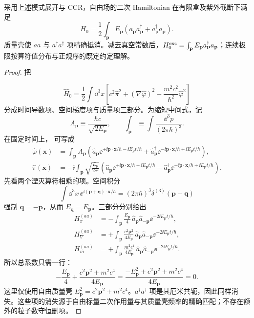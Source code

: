 \begin{proposition}
采用上述模式展开与 CCR，自由场的二次 Hamiltonian 在有限盒及紫外截断下满足
\[
H_0=\frac12\int_{\mathbf p}E_{\mathbf p}(a_{\mathbf p}a_{\mathbf p}^\dagger+a_{\mathbf p}^\dagger a_{\mathbf p}).
\]
质量壳使 $aa$ 与 $a^\dagger a^\dagger$ 项精确抵消。减去真空常数后，$H_0^{\rm exc}=\int_{\mathbf p}E_{\mathbf p}a_{\mathbf p}^\dagger a_{\mathbf p}$；连续极限按算符值分布与正规序的既定约定理解。
\end{proposition}
\begin{proof}
把

\begin{equation*}
 \hat H_0=\frac12\int\dd^3 x\left[
 c^2\hat\pi^2+(\nabla\hat\varphi)^2
 +\frac{m^2c^2}{\hbar^2}\hat\varphi^2
 \right]
 \end{equation*}
分成时间导数项、空间梯度项与质量项三部分。为缩短中间式，记
\begin{equation*}
 A_{\mathbf p}\equiv\frac{\hbar c}{\sqrt{2E_{\mathbf p}}},
 \qquad \int_{\mathbf p}\equiv\int\frac{\dd^3 p}{(2\pi\hbar)^3}.
\end{equation*}
在固定时间上， 可写成
\begin{align*}
 \hat\varphi(\mathbf x)
 &=\int_{\mathbf p}A_{\mathbf p}
 \left(\hat a_{\mathbf p}\ee^{+\ii\mathbf p\cdot\mathbf x/\hbar-\ii E_{\mathbf p}t/\hbar}
 +\hat a_{\mathbf p}^\dagger \ee^{-\ii\mathbf p\cdot\mathbf x/\hbar+\ii E_{\mathbf p}t/\hbar}\right),\\
 \hat\pi(\mathbf x)
 &=-\ii\int_{\mathbf p}\sqrt{\frac{E_{\mathbf p}}{2c^2}}
 \left(\hat a_{\mathbf p}\ee^{+\ii\mathbf p\cdot\mathbf x/\hbar-\ii E_{\mathbf p}t/\hbar}
 -\hat a_{\mathbf p}^\dagger \ee^{-\ii\mathbf p\cdot\mathbf x/\hbar+\ii E_{\mathbf p}t/\hbar}\right).
 \end{align*}
先看两个湮灭算符相乘的项。空间积分
\begin{equation*}
 \int\dd^3 x\,
 \ee^{\ii(\mathbf p+\mathbf q)\cdot\mathbf x/\hbar}
 =(2\pi\hbar)^3\delta^{(3)}(\mathbf p+\mathbf q)
 \end{equation*}
强制 $\mathbf q=-\mathbf p$，从而 $E_{\mathbf q}=E_{\mathbf p}$。三部分分别给出
\begin{align*}
 H_{\pi}^{(aa)}
 &=-\int_{\mathbf p}\frac{E_{\mathbf p}}{4}\,
 \hat a_{\mathbf p}\hat a_{-\mathbf p}
 \ee^{-2\ii E_{\mathbf p}t/\hbar},\\
 H_{\nabla}^{(aa)}
 &=+\int_{\mathbf p}\frac{c^2\mathbf p^2}{4E_{\mathbf p}}\,
 \hat a_{\mathbf p}\hat a_{-\mathbf p}
 \ee^{-2\ii E_{\mathbf p}t/\hbar},\\
 H_{m}^{(aa)}
 &=+\int_{\mathbf p}\frac{m^2c^4}{4E_{\mathbf p}}\,
 \hat a_{\mathbf p}\hat a_{-\mathbf p}
 \ee^{-2\ii E_{\mathbf p}t/\hbar}.
 \end{align*}
所以总系数只需一行：
\begin{equation*}
 -\frac{E_{\mathbf p}}4+\frac{c^2\mathbf p^2+m^2c^4}{4E_{\mathbf p}}
 =\frac{-E_{\mathbf p}^2+c^2\mathbf p^2+m^2c^4}{4E_{\mathbf p}}=0.
\end{equation*}
这里仅使用自由质量壳 $E_{\mathbf p}^2=c^2\mathbf p^2+m^2c^4$。$a^\dagger a^\dagger$ 项是其厄米共轭，因此同样消失。这些项的消失源于自由标量二次作用量与其质量壳频率的精确匹配；不存在额外的粒子数守恒删项。


\end{proof}
